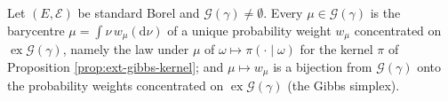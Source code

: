 \begin{theorem}
    \label{thm:ext-726}
    \leanok

    Let $(E, \mathcal{E})$ be standard Borel and $\mathcal{G}(\gamma) \neq \emptyset$. Every
    $\mu \in \mathcal{G}(\gamma)$ is the barycentre $\mu = \int \nu\, w_\mu(\mathrm{d}\nu)$ of a
    unique probability weight $w_\mu$ concentrated on $\operatorname{ex}\mathcal{G}(\gamma)$,
    namely the law under $\mu$ of $\omega \mapsto \pi(\cdot \mid \omega)$ for the kernel $\pi$ of
    Proposition \ref{prop:ext-gibbs-kernel}; and $\mu \mapsto w_\mu$ is a bijection from
    $\mathcal{G}(\gamma)$ onto the probability weights concentrated on
    $\operatorname{ex}\mathcal{G}(\gamma)$ (the Gibbs simplex).
\end{theorem}

